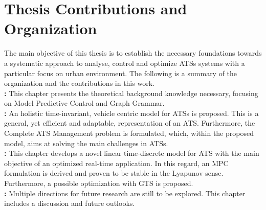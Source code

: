 \section{Thesis Contributions and Organization}
The main objective of this thesis is to establish the necessary foundations towards a systematic approach to analyse, control and optimize ATSs systems with a particular focus on urban environment. The following is a summary of the organization and the contributions in this work. \\
\textbf{: } This chapter presents the theoretical background knowledge necessary, focusing on Model Predictive Control and Graph Grammar. \\
\textbf{: } An holistic time-invariant, vehicle centric model for ATSs is proposed. This is a general, yet efficient and adaptable, representation of an ATS. Furthermore, the Complete ATS Management problem is formulated, which, within the proposed model, aims at solving the main challenges in ATSs. \\
\textbf{: } This chapter develops a novel linear time-discrete model for ATS with the main objective of an optimized real-time application. In this regard, an MPC formulation is derived and proven to be stable in the Lyapunov sense. Furthermore, a possible optimization with GTS is proposed. \\
\textbf{: } Multiple directions for future research are still to be explored. This chapter includes a discussion and future outlooks. 